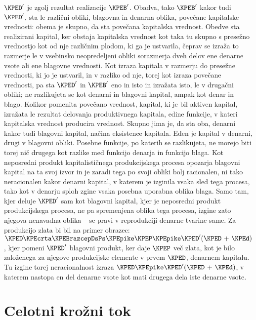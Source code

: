 \documentclass[kapital_02.tex]{subfiles}
\begin{document}
\(\KPED'\) je zgolj rezultat realizacije \(\KPEB'\). Obadva, tako \(\KPEB'\) kakor tudi \(\KPED'\), sta le različni obliki, blagovna in denarna oblika, povečane kapitalske vrednosti: obema je skupno, da sta povečana kapitalska vrednost. Obedve sta realizirani kapital, ker obstaja kapitalska vrednost kot taka tu skupno s presežno vrednostjo kot od nje različnim plodom, ki ga je ustvarila, čeprav se izraža to razmerje le v vsebinsko neopredeljeni obliki sorazmerja dveh delov ene denarne vsote ali ene blagovne vrednosti. Kot izraza kapitala v razmerju do presežne vrednosti, ki jo je ustvaril, in v razliko od nje, torej kot izraza povečane vrednosti, pa sta \(\KPED'\) in \(\KPEB'\) eno in isto in izražata isto, le v drugačni obliki; ne razlikujeta se kot denarni in blagovni kapital, ampak kot denar in blago. Kolikor pomenita povečano vrednost, kapital, ki je bil aktiven kapital, izražata le rezultat delovanja produktivnega kapitala, edine funkcije, v kateri kapitalska vrednost producira vrednost. Skupno jima je, da sta oba, denarni kakor tudi blagovni kapital, načina eksistence kapitala. Eden je kapital v denarni, drugi v blagovni obliki. Posebne funkcije, po katerih se razlikujeta, ne morejo biti torej nič drugega kot razlike med funkcijo denarja in funkcijo blaga. Kot neposredni produkt kapitalističnega produkcijskega procesa opozarja blagovni kapital na ta svoj izvor in je zaradi tega po svoji obliki bolj racionalen, ni tako neracionalen kakor denarni kapital, v katerem je izginila vsaka sled \KPEstran tega procesa, tako kot v denarju sploh zgine vsaka posebna uporabna oblika blaga. Samo tam, kjer deluje \(\KPED'\) sam kot blagovni kapital, kjer je neposredni produkt produkcijskega procesa, ne pa spremenjena oblika tega procesa, izgine zato njegova nenavadna oblika -- se pravi v reprodukciji denarne tvarine same. Za produkcijo zlata bi bil na primer obrazec: \(\KPED\KPEcrta\KPEBrazcepDsPs\KPEpike\KPEP\KPEpike\KPED' (\KPED \textrm{ + } \KPEd)\), kjer pomeni \(\KPED'\) blagovni produkt, ker daje \(\KPEP\) več zlata, kot je bilo založenega za njegove produkcijske elemente v prvem \(\KPED\), denarnem kapitalu. Tu izgine torej neracionalnost izraza \(\KPED\KPEpike\KPED' (\KPED \textrm{ + } \KPEd)\), v katerem nastopa en del denarne vsote kot mati drugega dela iste denarne vsote.

\section{Celotni krožni tok}
\end{document}
